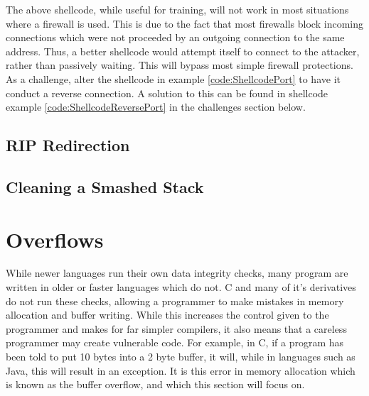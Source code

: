 \documentclass[a4paper,11pt]{report}
\begin{document}
				The above shellcode, while useful for training, will not work in most situations where a firewall is used. 
				This is due to the fact that most firewalls block incoming connections which were not proceeded by an outgoing connection to the same address. 
				Thus, a better shellcode would attempt itself to connect to the attacker, rather than passively waiting. 
				This will bypass most simple firewall protections. 
				As a challenge, alter the shellcode in example \ref{code:ShellcodePort} to have it conduct a reverse connection. 
				A solution to this can be found in shellcode example \ref{code:ShellcodeReversePort} in the challenges section below. 

			\subsection{RIP Redirection}
			\subsection{Cleaning a Smashed Stack}

	\section{Overflows}
		While newer languages run their own data integrity checks, many program are written in older or faster languages which do not. 
		C and many of it's derivatives do not run these checks, allowing a programmer to make mistakes in memory allocation and buffer writing. 
		While this increases the control given to the programmer and makes for far simpler compilers, it also means that a careless programmer may create vulnerable code. 
		For example, in C, if a program has been told to put 10 bytes into a 2 byte buffer, it will, while in languages such as Java, this will result in an exception. 
		It is this error in memory allocation which is known as the buffer overflow, and which this section will focus on. 
\end{document}
